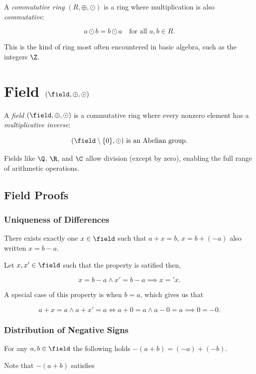 A \emph{commutative ring} \((R, \oplus, \odot)\) is a ring where multiplication is also \emph{commutative}:

\[
	a \odot b = b \odot a \quad \text{for all } a, b \in R.
\]

This is the kind of ring most often encountered in basic algebra, such as the integers \(\Z\).

\section{Field \texorpdfstring{\((\field, \oplus, \odot)\)}{}}

A \emph{field} \((\field, \oplus, \odot)\) is a commutative ring where every nonzero element has a \emph{multiplicative inverse}:

\[
	(\field \setminus \{0\}, \odot) \text{ is an Abelian group}.
\]

Fields like \(\Q\), \(\R\), and \(\C\) allow division (except by zero), enabling the full range of arithmetic operations.

\subsection{Field Proofs}

\subsubsection{Uniqueness of Differences}

There exists exactly one \(x \in \field\) such that \(a + x = b\), \(x = b + (-a)\) also written
\(x = b - a\).

Let \(x, x' \in \field\) such that the property is satified then,

\[
	x = b - a \land x' = b - a \implies x = 'x.
\]

\QED

A special case of this property is when \(b = a\), which gives us that

\[
	a + x = a \land a + x' = a \iff a + 0 = a \land a - 0 = a \implies 0 = -0.
\]

\subsubsection{Distribution of Negative Signs}

For any \(a, b \in \field\) the following holds \(-(a + b)  = (-a) + (-b)\).

Note that \(-(a + b)\) satisfies

